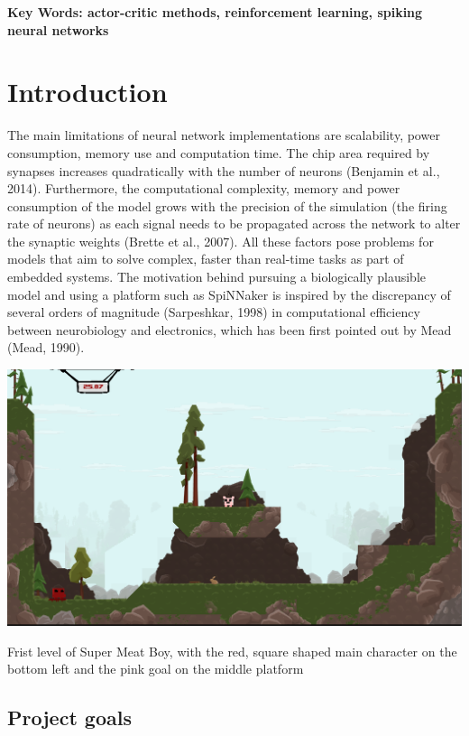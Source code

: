 \documentclass[10pt]{article}
\begin{document}
    \textbf{Key Words: actor-critic methods, reinforcement learning, spiking neural networks}


    \tableofcontents
    \section{Introduction}
    
    The main limitations of neural network implementations are scalability, power consumption, memory use and computation time. The chip area required by synapses increases quadratically with the number of neurons (Benjamin et al., 2014). Furthermore, the computational complexity, memory and power consumption of the model grows with the precision of the simulation (the firing rate of neurons) as each signal needs to be propagated across the network to alter the synaptic weights (Brette et al., 2007). All these factors pose problems for models that aim to solve complex, faster than real-time tasks as part of embedded systems. The motivation behind pursuing a biologically plausible model and using a platform such as SpiNNaker is inspired by the discrepancy of several orders of magnitude (Sarpeshkar, 1998) in computational efficiency between neurobiology and electronics, which has been first pointed out by Mead (Mead, 1990).

    \begin{suppfigure*}[b]
    \center
    \includegraphics[width=170mm]{./level1.png}
    \caption{Frist level of Super Meat Boy, with the red, square shaped main character on the bottom left and the pink goal on the middle platform}
    \label{fig:firstLevel}
    \end{suppfigure*}

    \subsection{Project goals}
\end{document}
